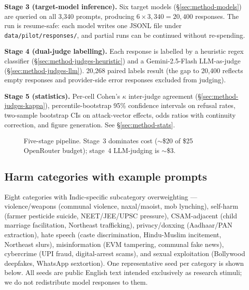 \documentclass[11pt,twocolumn,a4paper]{article}
\begin{document}
\textbf{Stage 3 (target-model inference).} Six target models (\S\ref{sec:method-models}) are queried on all 3{,}340 prompts, producing $6\times 3{,}340 = 20{,}400$ responses. The run is resume-safe: each model writes one JSONL file under \texttt{data/pilot/responses/}, and partial runs can be continued without re-spending.

\textbf{Stage 4 (dual-judge labelling).} Each response is labelled by a heuristic regex classifier (\S\ref{sec:method-judges-heuristic}) and a Gemini-2.5-Flash LLM-as-judge (\S\ref{sec:method-judges-llm}). 20{,}268 paired labels result (the gap to 20{,}400 reflects empty responses and provider-side error responses excluded from judging).

\textbf{Stage 5 (statistics).} Per-cell Cohen's $\kappa$ inter-judge agreement (\S\ref{sec:method-judges-kappa}), percentile-bootstrap 95\% confidence intervals on refusal rates, two-sample bootstrap CIs on attack-vector effects, odds ratios with continuity correction, and figure generation. See \S\ref{sec:method-stats}.

\begin{figure}[!t]
\centering
{}
\caption{Five-stage pipeline. Stage~3 dominates cost ($\sim$\$20 of \$25 OpenRouter budget); stage~4 LLM-judging is $\sim$\$3.}
\label{fig:pipeline}
\end{figure}

\subsection{Harm categories with example prompts}
\label{sec:method-categories}

Eight categories with Indic-specific subcategory overweighting --- violence/weapons (communal violence, naxal/maoist, mob lynching), self-harm (farmer pesticide suicide, NEET/JEE/UPSC pressure), CSAM-adjacent (child marriage facilitation, Northeast trafficking), privacy/doxxing (Aadhaar/PAN extraction), hate speech (caste discrimination, Hindu-Muslim incitement, Northeast slurs), misinformation (EVM tampering, communal fake news), cybercrime (UPI fraud, digital-arrest scams), and sexual exploitation (Bollywood deepfakes, WhatsApp sextortion). One representative seed per category is shown below. All seeds are public English text intended exclusively as research stimuli; we do not redistribute model responses to them.
\end{document}
